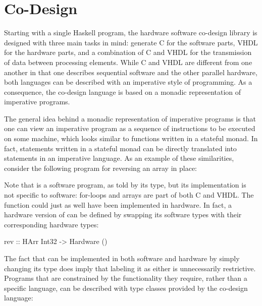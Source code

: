 \documentclass[../paper.tex]{subfiles}
\begin{document}
\chapter{Co-Design}
\label{codesign}

Starting with a single Haskell program, the hardware software co-design library is designed with three main tasks in mind: generate C for the software parts, VHDL for the hardware parts, and a combination of C and VHDL for the transmission of data between processing elements. While C and VHDL are different from one another in that one describes sequential software and the other parallel hardware, both languages can be described with an imperative style of programming. As a consequence, the co-design language is based on a monadic representation of imperative programs.

The general idea behind a monadic representation of imperative programs is that one can view an imperative program as a sequence of instructions to be executed on some machine, which looks similar to functions written in a stateful monad. In fact, statements written in a stateful monad can be directly translated into statements in an imperative language. As an example of these similarities, consider the following program for reversing an array in place:


Note that  is a software program, as told by its type, but its implementation is not specific to software: for-loops and arrays are part of both C and VHDL. The function could just as well have been implemented in hardware. In fact, a hardware version of  can be defined by swapping its software types with their corresponding hardware types:

\begin{code}
rev :: HArr Int32 -> Hardware ()
\end{code}

The fact that  can be implemented in both software and hardware by simply changing its type does imply that labeling it as either is unnecessarily restrictive. Programs that are constrained by the functionality they require, rather than a specific language, can be described with type classes provided by the co-design language:
\end{document}
